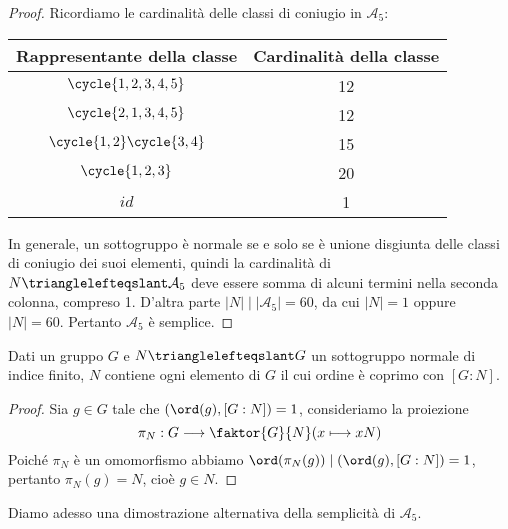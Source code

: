 \documentclass[11pt]{scrartcl}
\begin{document}
\begin{proof}
    Ricordiamo le cardinalità delle classi di coniugio in $\mathcal{A}_5$:


    \begingroup
    \renewcommand{\arraystretch}{1.5}
    \begin{center}
    \begin{tabular}{c|c}
        Rappresentante della classe & Cardinalità della classe\\
        \hline
        $\cycle{1, 2, 3, 4, 5}$ & 12\\
        $\cycle{2, 1, 3, 4, 5}$ & 12\\
        $\cycle{1, 2}\cycle{3, 4}$ & 15\\
        $\cycle{1, 2, 3}$ & 20\\
        $id$ & 1 
    \end{tabular}
    \end{center}
    \endgroup
    In generale, un sottogruppo è normale se e solo se è unione disgiunta
    delle classi di coniugio dei suoi elementi, quindi la cardinalità
    di $N \trianglelefteqslant \mathcal{A}_5$ deve essere somma di alcuni 
    termini nella seconda colonna, compreso 1. D'altra parte $|N| \mid |\mathcal{A}_5| = 60$,
    da cui $|N| = 1$ oppure $|N| = 60$. Pertanto $\mathcal{A}_5$ è semplice.
\end{proof}

\begin{lemma}
    \label{lemma1.62}
    Dati un gruppo $G$ e $N\trianglelefteqslant G$ un sottogruppo normale di 
    indice finito, $N$ contiene ogni elemento di $G$ il cui ordine è coprimo
    con $[G:N]$.
\end{lemma}

\begin{proof}
    Sia $g \in G$ tale che $(\ord(g), [G:N]) = 1$, consideriamo la proiezione
    \[
        \pi_N:G \longrightarrow \faktor{G}{N} (x \longmapsto xN)
    \]
    Poiché $\pi_N$ è un omomorfismo abbiamo $\ord(\pi_N(g)) \mid (\ord(g), [G:N]) = 1$,
    pertanto $\pi_N(g) = N$, cioè $g \in N$.
\end{proof}

Diamo adesso una dimostrazione alternativa della semplicità di $\mathcal{A}_5$.
\end{document}
